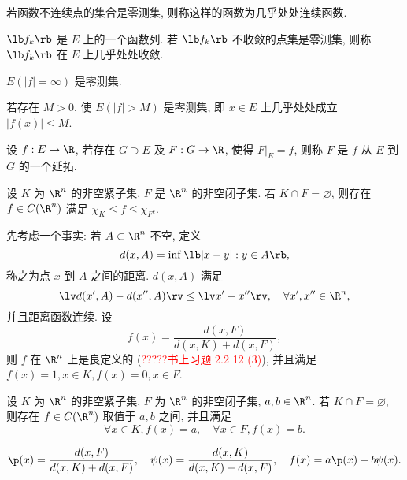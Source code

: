 \documentclass[UTF8, a4paper, 12pt, twoside, onecolumn]{book}
\begin{document}
\begin{Definition}[几乎处处连续]
	若函数不连续点的集合是零测集, 则称这样的函数为几乎处处连续函数.
\end{Definition}

\begin{Definition}[几乎处处收敛]
	$\lb f_k \rb$ 是 $E$ 上的一个函数列. 若 $\lb f_k \rb$ 不收敛的点集是零测集, 则称 $\lb f_k \rb$ 在 $E$ 上几乎处处收敛.
\end{Definition}

\begin{Definition}[几乎处处有限]
	$E(|f| = \infty)$ 是零测集.
\end{Definition}

\begin{Definition}[本性有界]
	若存在 $M > 0$, 使 $E(|f| > M)$ 是零测集, 即 $x \in E$ 上几乎处处成立 $|f(x)| \leq M$.
\end{Definition}

\begin{Definition}[延拓]
	设 $f : E \to \R$, 若存在 $G \supset E$ 及 $F : G \to \R$, 使得 $F|_E = f$, 则称 $F$ 是 $f$ 从 $E$ 到 $G$ 的一个延拓.
\end{Definition}

\begin{Lemma}
	设 $K$ 为 $\R^n$ 的非空紧子集, $F$ 是 $\R^n$ 的非空闭子集. 若 $K \cap F = \varnothing$, 则存在 $f \in C(\R^n)$ 满足 $\chi_K \leq f \leq \chi_{F^c}$.
\end{Lemma}

\begin{Proof}
	先考虑一个事实: 若 $A \subset \R^n$ 不空, 定义
	$$d(x, A) = \inf \lb |x - y| : y \in A \rb,$$
	称之为点 $x$ 到 $A$ 之间的距离. $d(x, A)$ 满足
	$$\lv d(x', A) - d(x'', A) \rv \leq \lv x' - x'' \rv,\quad \forall x', x'' \in \R^n,$$
	并且距离函数连续. 设
	$$f(x) = \dfrac{d(x, F)}{d(x, K) + d(x, F)},$$
	则 $f$ 在 $\R^n$ 上是良定义的 (\textcolor{red}{?????书上习题 2.2 12 (3)}), 并且满足 $f(x) = 1, x \in K, f(x) = 0, x \in F$.
\end{Proof}

\begin{Corollary}\label{cor:KFab}
	设 $K$ 为 $\R^n$ 的非空紧子集, $F$ 为 $\R^n$ 的非空闭子集, $a, b \in \R^n$. 若 $K \cap F = \varnothing$, 则存在 $f \in C(\R^n)$ 取值于 $a, b$ 之间, 并且满足
	$$\forall x \in K, f(x) = a,\quad \forall x \in F, f(x) = b.$$
\end{Corollary}

\begin{Proof}
	\begin{align*}
		\p (x) = \dfrac{d(x, F)}{d(x, K) + d(x, F)}, \quad \psi (x) = \dfrac{d(x, K)}{d(x, K) + d(x, F)},\quad f(x) = a\p(x) + b\psi(x).
	\end{align*}
\end{Proof}
\end{document}
